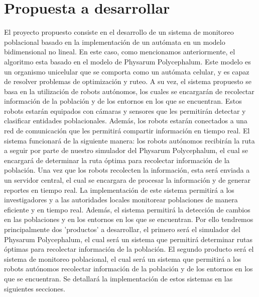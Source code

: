 \section{Propuesta a desarrollar}
\label{sec:Propuesta a desarrollar}
        El proyecto propuesto consiste en el desarrollo de un sistema de monitoreo poblacional basado en 
            la implementaci\'on de un aut\'omata en un modelo bidimensional no lineal. En este caso, 
            como mencionamos anteriormente, el algoritmo esta basado en el modelo de Physarum Polycephalum.
            Este modelo es un organismo unicelular que se comporta como un aut\'omata celular,
            y es capaz de resolver problemas de optimizaci\'on y ruteo.
        \vskip 0.5cm
        A su vez, el sistema propuesto se basa en la utilizaci\'on de robots aut\'onomos, los cuales 
            se encargar\'an de recolectar informaci\'on de la poblaci\'on y de los entornos en los que 
            se encuentran. Estos robots estar\'an equipados con c\'amaras y sensores que les permitir\'an 
            detectar y clasificar entidades poblacionales. Adem\'as, los robots estar\'an conectados a 
            una red de comunicaci\'on que les permitir\'a compartir informaci\'on en tiempo real.
        \vskip 0.5cm
        El sistema funcionar\'a de la siguiente manera: los robots aut\'onomos recibir\'an la ruta a seguir 
            por parte de nuestro simulador del Physarum Polycephalum, el cual se encargar\'a de determinar
            la ruta \'optima para recolectar informaci\'on de la poblaci\'on. Una vez que los robots
            recolecten la informaci\'on, esta ser\'a enviada a un servidor central, el cual se encargara
            de procesar la informaci\'on y de generar reportes en tiempo real.
        \vskip 0.5cm
        La implementaci\'on de este sistema permitir\'a a los investigadores y a las autoridades locales
            monitorear poblaciones de manera eficiente y en tiempo real. Adem\'as, el sistema permitir\'a
            la detecci\'on de cambios en las poblaciones y en los entornos en los que se encuentran.
        \vskip 0.5cm
        Por ello tendremos principalmente dos 'productos' a desarrollar, el primero ser\'a el simulador
            del Physarum Polycephalum, el cual ser\'a un sistema que permitir\'a determinar rutas \'optimas
            para recolectar informaci\'on de la poblaci\'on. El segundo producto ser\'a el sistema de 
            monitoreo poblacional, el cual ser\'a un sistema que permitir\'a a los robots aut\'onomos 
            recolectar informaci\'on de la poblaci\'on y de los entornos en los que se encuentran.
        \vskip 0.5cm
        Se detallar\'a la implementaci\'on de estos sistemas en las siguientes secciones.
    
    